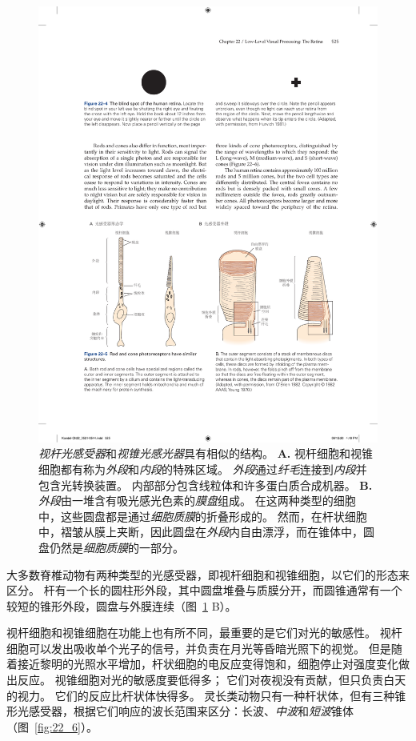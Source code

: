 \begin{figure}[htbp]
	\centering
	\includegraphics[width=1.0\linewidth]{chap22/fig_22_5}
	\caption{\textit{视杆光感受器}和\textit{视锥光感光器}具有相似的结构。
		\textbf{A.} 视杆细胞和视锥细胞都有称为\textit{外段}和\textit{内段}的特殊区域。
		\textit{外段}通过\textit{纤毛}连接到\textit{内段}并包含光转换装置。
		内部部分包含线粒体和许多蛋白质合成机器。
		\textbf{B.} \textit{外段}由一堆含有吸光感光色素的\textit{膜盘}组成。
		在这两种类型的细胞中，这些圆盘都是通过\textit{细胞质膜}的折叠形成的。
		然而，在杆状细胞中，褶皱从膜上夹断，因此圆盘在\textit{外段}内自由漂浮，而在锥体中，圆盘仍然是\textit{细胞质膜}的一部分\cite{o1982chemistry,young1970visual}。}
	\label{fig:22_5}
\end{figure}


大多数脊椎动物有两种类型的光感受器，即视杆细胞和视锥细胞，以它们的形态来区分。
杆有一个长的圆柱形外段，其中圆盘堆叠与质膜分开，而圆锥通常有一个较短的锥形外段，圆盘与外膜连续（图~\ref{fig:22_5} B）。


视杆细胞和视锥细胞在功能上也有所不同，最重要的是它们对光的敏感性。
视杆细胞可以发出吸收单个光子的信号，并负责在月光等昏暗光照下的视觉。
但是随着接近黎明的光照水平增加，杆状细胞的电反应变得饱和，细胞停止对强度变化做出反应。 
视锥细胞对光的敏感度要低得多；
它们对夜视没有贡献，但只负责白天的视力。
它们的反应比杆状体快得多。
灵长类动物只有一种杆状体，但有三种锥形光感受器，根据它们响应的波长范围来区分：长波、\textit{中波}和\textit{短波}锥体（图~\ref{fig:22_6}）。


